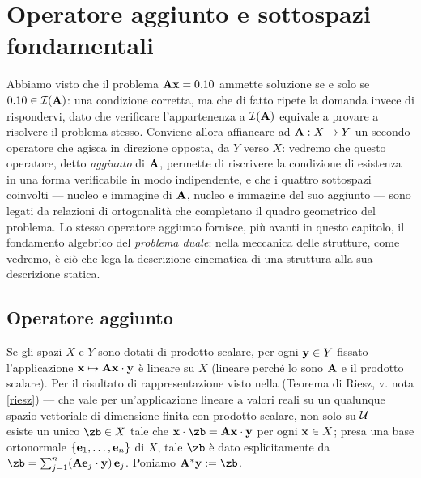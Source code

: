 \section{Operatore aggiunto e sottospazi fondamentali}

Abbiamo visto che il problema $\mathbf{A}\mathbf{x}=0.10$ ammette soluzione se e solo se $0.10\in\mathcal{I}(\mathbf{A})$: una condizione corretta, ma che di fatto ripete la domanda invece di rispondervi, dato che verificare l'appartenenza a $\mathcal{I}(\mathbf{A})$ equivale a provare a risolvere il problema stesso. Conviene allora affiancare ad $\mathbf{A}: X \rightarrow Y$ un secondo operatore che agisca in direzione opposta, da $Y$ verso $X$: vedremo che questo operatore, detto \textit{aggiunto} di $\mathbf{A}$, permette di riscrivere la condizione di esistenza in una forma verificabile in modo indipendente, e che i quattro sottospazi coinvolti --- nucleo e immagine di $\mathbf{A}$, nucleo e immagine del suo aggiunto --- sono legati da relazioni di ortogonalità che completano il quadro geometrico del problema. Lo stesso operatore aggiunto fornisce, più avanti in questo capitolo, il fondamento algebrico del \textit{problema duale}: nella meccanica delle strutture, come vedremo, è ciò che lega la descrizione cinematica di una struttura alla sua descrizione statica.

\subsection{Operatore aggiunto}\label{sec:aggiunto_sottospazi}

Se gli spazi $X$ e $Y$ sono dotati di prodotto scalare, per ogni $\mathbf{y}\in Y$ fissato l'applicazione $\mathbf{x}\mapsto\mathbf{A}\mathbf{x}\cdot\mathbf{y}$ \`e  lineare su $X$ (lineare perch\'e lo sono $\mathbf{A}$ e il prodotto scalare). Per il risultato di rappresentazione visto nella    (Teorema di Riesz, v. nota \ref{riesz}) --- che vale per  un'applicazione lineare a valori reali  su un qualunque spazio vettoriale di dimensione finita con prodotto scalare, non solo su $\mathcal{U}$ --- esiste un unico $\zb\in X$ tale che $\xb\cdot\zb=\Abb\xb\cdot\yb$ per ogni $\mathbf{x}\in X$; presa una base ortonormale $\{\mathbf{e}_1,\dots,\mathbf{e}_n\}$ di $X$, tale $\zb$ \`e dato esplicitamente da $\zb=\sum_{j=1}^n(\Abb\eb_j\cdot\yb)\,\eb_j$. Poniamo $\Abb^\ast\yb:=\zb$.

